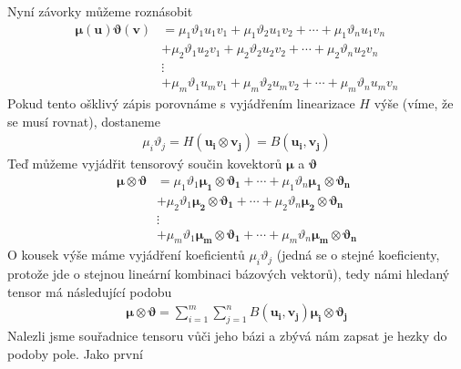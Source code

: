 \documentclass[a5paper,12pt]{amsbook}
\theoremstyle{definition}
\newcommand{\myvec}[1]{\bm{#1}}
\begin{document}
Nyní závorky můžeme roznásobit
\begin{equation*}
\begin{split}
\myvec{\mu}(\myvec{u})\myvec{\vartheta}(\myvec{v}) &=
  \mu_1\vartheta_1 u_1 v_1 + \mu_1\vartheta_2 u_1 v_2 + \cdots + \mu_1\vartheta_n u_1 v_n \\
  &+ \mu_2\vartheta_1 u_2 v_1 + \mu_2\vartheta_2 u_2 v_2 + \cdots + \mu_2\vartheta_n u_2 v_n\\
  &\vdots \\
  &+ \mu_m\vartheta_1 u_m v_1 + \mu_m\vartheta_2 u_m v_2 + \cdots + \mu_m\vartheta_n u_m v_n
\end{split}
\end{equation*}
Pokud tento ošklivý zápis porovnáme s vyjádřením linearizace $H$ výše (víme, že se musí rovnat),
dostaneme
\begin{equation*}
\begin{split}
\mu_i\vartheta_j = H(\myvec{u_i}\otimes\myvec{v_j}) = B(\myvec{u_i}, \myvec{v_j})
\end{split}
\end{equation*}
Teď můžeme vyjádřit tensorový součin kovektorů $\myvec{\mu}$ a $\myvec{\vartheta}$
\begin{equation*}
\begin{split}
\myvec{\mu}\otimes\myvec{\vartheta} &=
  \mu_1\vartheta_1\myvec{\mu_1}\otimes\myvec{\vartheta_1} + \cdots 
    + \mu_1\vartheta_n\myvec{\mu_1}\otimes\myvec{\vartheta_n} \\
  & + \mu_2\vartheta_1\myvec{\mu_2}\otimes\myvec{\vartheta_1} + \cdots 
    + \mu_2\vartheta_n\myvec{\mu_2}\otimes\myvec{\vartheta_n} \\
  &\vdots \\
  & + \mu_m\vartheta_1\myvec{\mu_m}\otimes\myvec{\vartheta_1} + \cdots 
    + \mu_m\vartheta_n\myvec{\mu_m}\otimes\myvec{\vartheta_n}
\end{split}
\end{equation*}
O kousek výše máme vyjádření koeficientů $\mu_i\vartheta_j$ (jedná se o stejné koeficienty, protože
jde o stejnou lineární kombinaci bázových vektorů), tedy námi hledaný tensor má následující
podobu
\begin{equation*}
\begin{split}
\myvec{\mu}\otimes\myvec{\vartheta} 
  = \sum_{i=1}^{m}\sum_{j=1}^{n}B(\myvec{u_i}, \myvec{v_j})\myvec{\mu_i}\otimes\myvec{\vartheta_j}
\end{split}
\end{equation*}
Nalezli jsme souřadnice tensoru vůči jeho bázi a zbývá nám zapsat je hezky do podoby pole. Jako první
\end{document}
